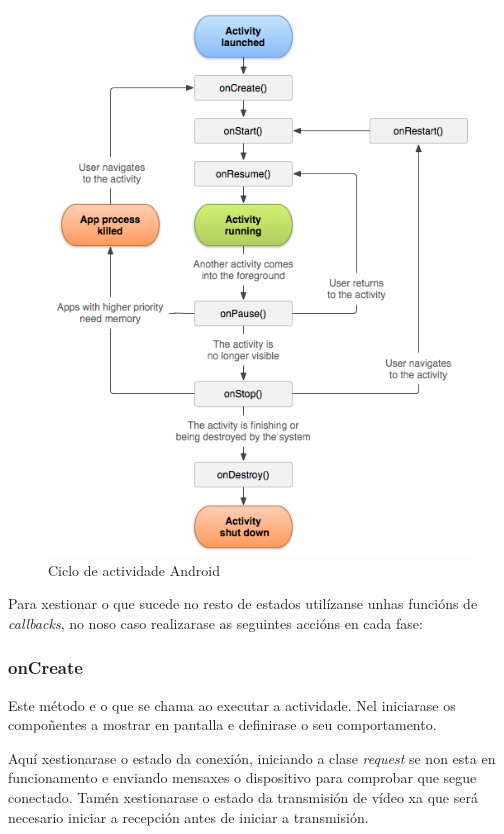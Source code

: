 \begin{figure}[tb]
  \centering
  \includegraphics[scale=.6]{imaxes/ciclo-actividade.png}
  \caption{Ciclo de actividade Android~\cite{UnderstandActivityLifecyclea}}
  \label{fig:actividade}
\end{figure}

Para xestionar o que sucede no resto de estados utilízanse unhas funcións de \emph{callbacks}, no noso caso realizarase as seguintes accións en cada fase:
\subsubsection{onCreate}
Este método e o que se chama ao executar a actividade. Nel iniciarase os compoñentes a mostrar en pantalla e definirase o seu comportamento.

Aquí xestionarase o estado da conexión, iniciando a clase \emph{request} se non esta en funcionamento e enviando mensaxes o dispositivo para comprobar que segue conectado. Tamén xestionarase o estado da transmisión de vídeo xa que será necesario iniciar a recepción antes de iniciar a transmisión.

